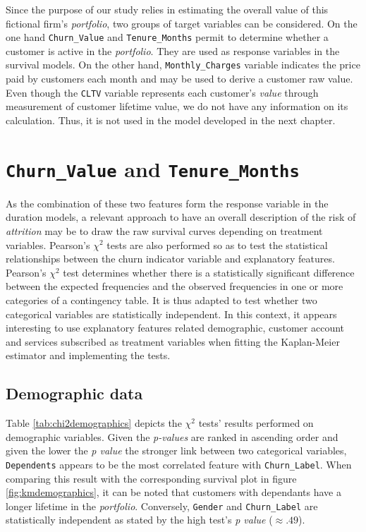 \documentclass[
]{book}
\begin{document}
Since the purpose of our study relies in estimating the overall value of this fictional firm's \emph{portfolio}, two groups of target variables can be considered. On the one hand \texttt{Churn\_Value} and \texttt{Tenure\_Months} permit to determine whether a customer is active in the \emph{portfolio}. They are used as response variables in the survival models. On the other hand, \texttt{Monthly\_Charges} variable indicates the price paid by customers each month and may be used to derive a customer raw value. Even though the \texttt{CLTV} variable represents each customer's \emph{value} through measurement of customer lifetime value, we do not have any information on its calculation. Thus, it is not used in the model developed in the next chapter.

\hypertarget{churndescstats}{%
\section{\texorpdfstring{\texttt{Churn\_Value} and \texttt{Tenure\_Months}}{Churn\_Value and Tenure\_Months}}\label{churndescstats}}

As the combination of these two features form the response variable in the duration models, a relevant approach to have an overall description of the risk of \emph{attrition} may be to draw the raw survival curves depending on treatment variables. Pearson's \(\chi^2\) tests are also performed so as to test the statistical relationships between the churn indicator variable and explanatory features. Pearson's \(\chi^2\) test determines whether there is a statistically significant difference between the expected frequencies and the observed frequencies in one or more categories of a contingency table. It is thus adapted to test whether two categorical variables are statistically independent. In this context, it appears interesting to use explanatory features related demographic, customer account and services subscribed as treatment variables when fitting the Kaplan-Meier estimator and implementing the tests.

\hypertarget{demographic-data}{%
\subsection*{Demographic data}\label{demographic-data}}

Table \ref{tab:chi2demographics} depicts the \(\chi^2\) tests' results performed on demographic variables. Given the \emph{p-values} are ranked in ascending order and given the lower the \emph{p value} the stronger link between two categorical variables, \texttt{Dependents} appears to be the most correlated feature with \texttt{Churn\_Label}. When comparing this result with the corresponding survival plot in figure \ref{fig:kmdemographics}, it can be noted that customers with dependants have a longer lifetime in the \emph{portfolio}. Conversely, \texttt{Gender} and \texttt{Churn\_Label} are statistically independent as stated by the high test's \emph{p value} (\(\approx .49\)).
\end{document}
